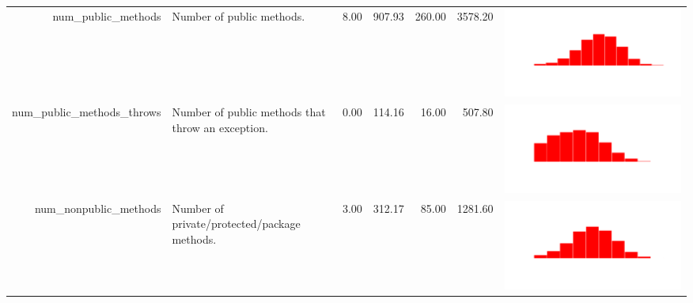 \begin{table}[ht]
\begin{tabular}{rp{16em}rrrrc}
  num\_public\_methods & Number of public methods. & 8.00 & 907.93 & 260.00 & 3578.20 & \includegraphics[scale = 0.1, clip = true, trim= 50px 60px 50px 60px]{hist-6a589f87539a5232bab5b7cb76849876.pdf} \\ 
  num\_public\_methods\_throws & Number of public methods that throw an exception. & 0.00 & 114.16 & 16.00 & 507.80 & \includegraphics[scale = 0.1, clip = true, trim= 50px 60px 50px 60px]{hist-abd19a466fed24b2e5ab69fd7b2523df.pdf} \\ 
  num\_nonpublic\_methods & Number of private/protected/package methods. & 3.00 & 312.17 & 85.00 & 1281.60 & \includegraphics[scale = 0.1, clip = true, trim= 50px 60px 50px 60px]{hist-5ffac6360ae85e10530d281920f084d5.pdf} \\ 

\end{tabular}
\end{table}
